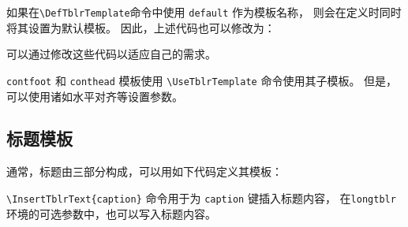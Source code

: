 \documentclass[oneside]{book}
\begin{document}
如果在\verb!\DefTblrTemplate!命令中使用 \verb!default! 作为模板名称，
则会在定义时同时将其设置为默认模板。
因此，上述代码也可以修改为：

\begin{codehigh}
\end{codehigh}

可以通过修改这些代码以适应自己的需求。

\verb!contfoot! 和 \verb!conthead! 模板使用 \verb!\UseTblrTemplate! 命令使用其子模板。
但是，可以使用诸如水平对齐等设置参数。

\begin{codehigh}
\end{codehigh}

\subsection{标题模板}

通常，标题由三部分构成，可以用如下代码定义其模板：

\begin{codehigh}
\end{codehigh}

\verb!\InsertTblrText{caption}! 命令用于为 \verb!caption! 键插入标题内容，
在\verb!longtblr!环境的可选参数中，也可以写入标题内容。
\end{document}
